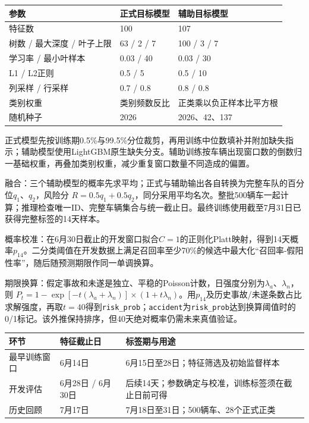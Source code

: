 \documentclass[UTF8,10pt]{ctexart}
\newcommand{\hdr}[1]{\par\vspace{0.4em}{\large\heiti\color{heading}#1}\par\vspace{0.4em}}
\newcommand{\secpage}[1]{\clearpage\hdr{#1}}
\newcommand{\thead}[1]{\textbf{\color{heading}#1}}
\begin{document}
\begin{center}\small
{}
\begin{tabularx}{\textwidth}{p{4.4cm} Y Y}
\thead{参数} & \thead{正式目标模型} & \thead{辅助目标模型} \\
\hline
特征数 & 100 & 107 \\
\hline
树数 / 最大深度 / 叶子上限 & 63 / 2 / 7 & 100 / 3 / 7 \\
\hline
学习率 / 最小叶样本 & 0.03 / 40 & 0.03 / 30 \\
\hline
L1 / L2正则 & 0.5 / 5 & 0.5 / 10 \\
\hline
列采样 / 行采样 & 0.7 / 0.8 & 0.8 / 0.8 \\
\hline
类别权重 & 类别频数反比 & 正类乘以负正样本比平方根 \\
\hline
随机种子 & 2026 & 2026、42、137 \\
\hline
\end{tabularx}
\end{center}

正式模型先按训练期0.5\%与99.5\%分位裁剪，再用训练中位数填补并附加缺失指示；辅助模型使用LightGBM原生缺失分支。辅助训练按车辆出现窗口数的倒数归一基础权重，再叠加类别权重，减少重复窗口数量不同造成的偏置。

融合：三个辅助模型的概率先求平均；正式与辅助输出各自转换为完整车队的百分位$q_1$、$q_2$，风险分 $R=0.5q_1+0.5q_2$，同分采用平均名次。整批500辆车一起计算；推理检查唯一ID、完整车辆集合与统一截止日。最终训练使用截至7月31日已获得完整标签的14天样本。

概率校准：在6月30日截止的开发窗口拟合$C=1$的正则化Platt映射，得到14天概率$p_{14}$。二分类阈值在开发数据上满足召回率至少70\%的候选中最大化“召回率-假阳性率”，随后随预测期限作同一单调换算。

期限换算：假定事故和未遂是独立、平稳的Poisson计数，日强度分别为$\lambda_a$、$\lambda_n$，则 $P_t=1-\exp[-t(\lambda_a+\lambda_n)]\times(1+t\lambda_n)$。用$p_{14}$及历史事故/未遂条数占比求解强度，再取$t=40$得到\texttt{risk\_prob}；\texttt{accident}为\texttt{risk\_prob}达到换算阈值时的0/1标记。该外推保持排序，但40天绝对概率仍需未来真值验证。

\secpage{03\;|\;时间验证与预测效果}

\begin{center}\small
{}
\begin{tabularx}{\textwidth}{p{2.8cm} p{3.4cm} Y}
\thead{环节} & \thead{特征截止日} & \thead{标签期与用途} \\
\hline
最早训练窗口 & 6月14日 & 6月15日至28日；特征筛选及初始监督样本 \\
\hline
开发评估 & 6月28日 / 6月30日 & 后续14天；参数确定与校准，训练标签须在截止日前可得 \\
\hline
历史回顾 & 7月17日 & 7月18日至31日；500辆车、28个正式正类 \\
\hline
\end{tabularx}
\end{center}
\end{document}
